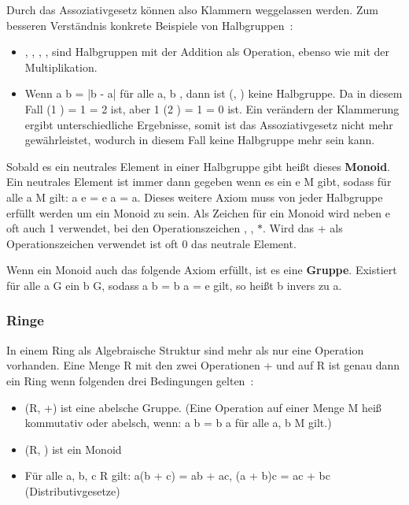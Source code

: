 			Durch das Assoziativgesetz können also Klammern weggelassen werden. Zum besseren Verständnis konkrete Beispiele von Halbgruppen~\cite{Erste:Hilfe:in:Linearer:Algebra}:
			
			\begin{itemize}
				\item {}, , , ,  sind Halbgruppen mit der Addition als Operation, ebenso wie mit der Multiplikation.
				\item Wenn a \mycirc b = |b - a| für alle a, b \myin \myMenge{Z}, dann ist (, \mycircOhne) keine Halbgruppe. Da in diesem Fall (1 ) \mycirc 3 = 1  = 2 ist, aber 1 \mycirc (2 ) = 1  = 0 ist. Ein verändern der Klammerung ergibt unterschiedliche Ergebnisse, somit ist das Assoziativgesetz nicht mehr gewährleistet, wodurch  in diesem Fall keine Halbgruppe mehr sein kann.
			\end{itemize}

			Sobald es ein neutrales Element in einer Halbgruppe gibt heißt dieses \textbf{Monoid}. Ein neutrales Element ist immer dann gegeben wenn es ein e \myin M gibt, sodass für alle a \myin M gilt: a \mycirc e = e \mycirc a = a. Dieses weitere Axiom muss von jeder Halbgruppe erfüllt werden um ein Monoid zu sein. Als Zeichen für ein Monoid wird neben e oft auch 1 verwendet, bei den Operationszeichen \mycircOhne, \mycdotOhne, $*$. Wird das + als Operationszeichen verwendet ist oft 0 das neutrale Element.~\cite{Erste:Hilfe:in:Linearer:Algebra}

			Wenn ein Monoid auch das folgende Axiom erfüllt, ist es eine \textbf{Gruppe}. Existiert für alle a \myin G ein b \myin G, sodass a \mycirc b = b \mycirc a = e gilt, so heißt b invers zu a.~\cite{Erste:Hilfe:in:Linearer:Algebra}
		
		\subsubsection{Ringe}
			In einem Ring als Algebraische Struktur sind mehr als nur eine Operation vorhanden. Eine Menge R mit den zwei Operationen + und \mycdot auf R ist genau dann ein Ring wenn folgenden drei Bedingungen gelten~\cite{Erste:Hilfe:in:Linearer:Algebra}:
			
			\begin{itemize}
				\item (R, +) ist eine abelsche Gruppe. (Eine Operation \mycirc auf einer Menge M heiß kommutativ oder abelsch, wenn: a \mycirc b = b \mycirc a für alle a, b \myin M gilt.)
				\item (R, \mycdotOhne) ist ein Monoid
				\item Für alle a, b, c \myin R gilt: a(b + c) = ab + ac, (a + b)c = ac + bc (Distributivgesetze)
			\end{itemize}
			
